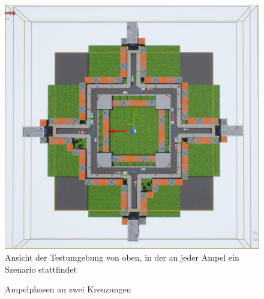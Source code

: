 \documentclass{Paper}
\begin{document}
\begin{figure}[H]
	\centering
	\includegraphics[scale=0.7]{../Bilder/map.png}
	\caption{Ansicht der Testumgebung von oben, in der an jeder Ampel ein Szenario stattfindet}
	\label{img:map}
\end{figure}




\begin{figure}[H]

	\caption{Ampelphasen an zwei Kreuzungen}
	\label{img:ampelphasen-1}
\end{figure}
\end{document}
